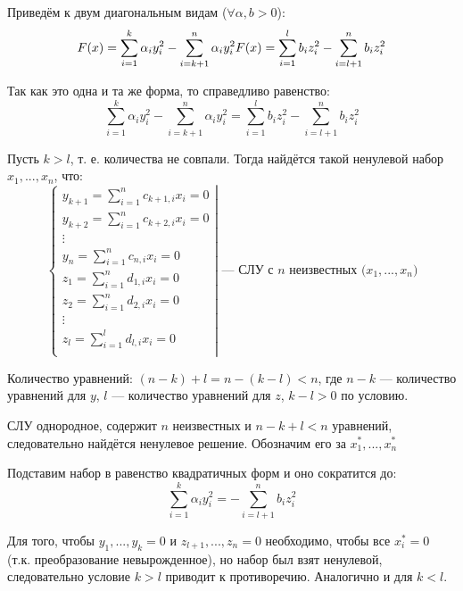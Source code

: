 \documentclass[12pt]{article}
\begin{document}
Приведём к двум диагональным видам ($\forall \alpha, b > 0$):
\[
    F(x) = \sum^k_{i=1}\alpha_{i}y_i^2 - \sum^n_{i=k + 1}\alpha_{i}y_i^2
    \\
    F(x) = \sum_{i=1}^lb_iz_i^2 - \sum_{i = l + 1}^nb_iz_i^2
\]

Так как это одна и та же форма, то справедливо равенство:
\[
    \sum^k_{i=1}\alpha_{i}y_i^2 - \sum^n_{i=k + 1}\alpha_{i}y_i^2 = \sum_{i=1}^lb_iz_i^2 - \sum_{i = l + 1}^nb_iz_i^2
\]

Пусть $k > l$, т. е. количества не совпали. Тогда найдётся такой ненулевой набор $x_1, ..., x_n$, что:
\[
    \left.\begin{cases}
        y_{k + 1} = \sum_{i = 1}^{n}c_{k + 1,i}x_i = 0 \\
        y_{k + 2} = \sum_{i = 1}^{n}c_{k + 2,i}x_i = 0 \\
        \vdots                                         \\
        y_{n} = \sum_{i = 1}^{n}c_{n,i}x_i = 0         \\
        z_{1} = \sum_{i = 1}^{n}d_{1,i}x_i = 0         \\
        z_{2} = \sum_{i = 1}^{n}d_{2,i}x_i = 0         \\
        \vdots                                         \\
        z_{l} = \sum_{i = 1}^{l}d_{l,i}x_i = 0         \\
    \end{cases}\right|
    \text{ — СЛУ с $n$ неизвестных ($x_1, ..., x_n$)}
\]

Количество уравнений: $(n - k) + l = n - (k - l) < n$, где $n - k$ — количество уравнений для $y$, $l$ — количество уравнений для $z$, $k - l > 0$ по условию.

СЛУ однородное, содержит $n$ неизвестных и $n - k + l < n$ уравнений, следовательно найдётся ненулевое решение. Обозначим его за $x_1^*, ..., x_n^*$

Подставим набор в равенство квадратичных форм и оно сократится до:
\[
    \sum^k_{i=1}\alpha_{i}y_i^2 = -\sum_{i = l + 1}^nb_iz_i^2
\]

Для того, чтобы $y_{1}, ..., y_k = 0$ и $z_{l + 1}, ..., z_n = 0$ необходимо, чтобы все $x_i^* = 0$ (т.к. преобразование невырожденное), но набор был взят ненулевой, следовательно условие $k > l$ приводит к противоречию. Аналогично и для $k < l$.
\end{document}
